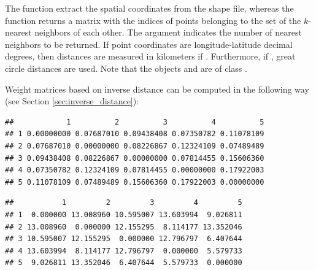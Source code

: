The function  extract the spatial coordinates from the shape file, whereas the function  returns a matrix with the indices of points belonging to the set of the $k$-nearest neighbors of each other. The argument  indicates the number of nearest neighbors to be returned. If point coordinates are longitude-latitude decimal degrees, then distances are measured in kilometers if . Furthermore, if , great circle distances are used. Note that the objects  and  are of class .

Weight matrices based on inverse distance can be computed in the following way (see Section \ref{sec:inverse_distance}):

\begin{knitrout}
\color{fgcolor}\begin{kframe}
\begin{alltt}
 \hlkwb{<-} \hlstd{(}  \hlstd{=} \hlstd{))}
\hlstd{dist.mat[}\hlopt{:}\hlstd{,} \hlopt{:}\hlstd{]}
\end{alltt}
\begin{verbatim}
##            1          2          3          4          5
## 1 0.00000000 0.07687010 0.09438408 0.07350782 0.11078109
## 2 0.07687010 0.00000000 0.08226867 0.12324109 0.07489489
## 3 0.09438408 0.08226867 0.00000000 0.07814455 0.15606360
## 4 0.07350782 0.12324109 0.07814455 0.00000000 0.17922003
## 5 0.11078109 0.07489489 0.15606360 0.17922003 0.00000000
\end{verbatim}
\begin{alltt}
 \hlkwb{<-}  \hlopt{/}  
 \hlkwb{<-}       
\hlstd{dist.mat.inv[}\hlopt{:}\hlstd{,} \hlopt{:}\hlstd{]}
\end{alltt}
\begin{verbatim}
##           1         2         3         4         5
## 1  0.000000 13.008960 10.595007 13.603994  9.026811
## 2 13.008960  0.000000 12.155295  8.114177 13.352046
## 3 10.595007 12.155295  0.000000 12.796797  6.407644
## 4 13.603994  8.114177 12.796797  0.000000  5.579733
## 5  9.026811 13.352046  6.407644  5.579733  0.000000
\end{verbatim}

\end{kframe}
\end{knitrout}
